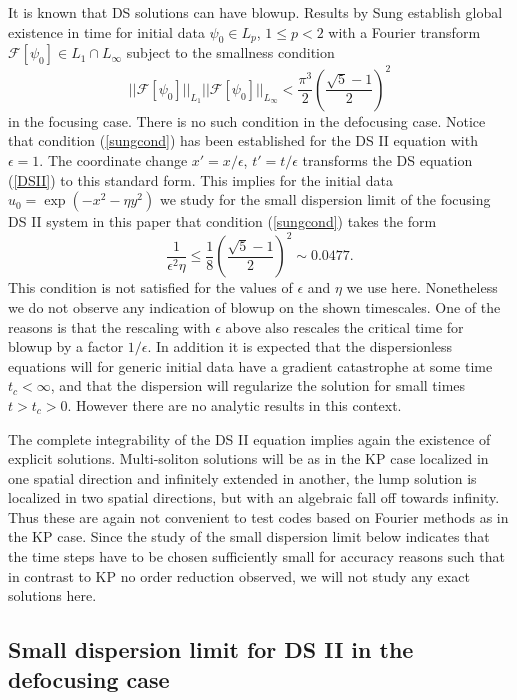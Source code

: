 \documentclass[final]{siamltex}
\begin{document}
It is known that DS solutions can have blowup. Results by Sung 
\cite{Sun} establish global existence in time for 
initial data $\psi_{0}\in L_{p}$, $1\leq p < 2$ with a Fourier 
transform $\mathcal{F}[\psi_{0}]\in L_{1}\cap L_{\infty}$ subject to the 
smallness condition 
\begin{equation}
    ||\mathcal{F}[\psi_{0}]||_{L_{1}}||\mathcal{F}[\psi_{0}]||_{L_{\infty}}
    <\frac{\pi^{3}}{2}\left(\frac{\sqrt{5}-1}{2}\right)^{2}
    \label{sungcond}
\end{equation}
in the 
focusing case. There is no such condition in the defocusing case. 
Notice that condition (\ref{sungcond}) has been established for the DS II 
equation with $\epsilon=1$. The coordinate change $x'=x/\epsilon$, 
$t'=t/\epsilon$ transforms the DS equation (\ref{DSII}) to this 
standard form. 
This implies for the initial data $u_{0}=\exp(-x^{2}-\eta y^{2})$ we study for the small dispersion 
limit of the focusing DS II system  in this paper that condition 
(\ref{sungcond}) takes the form 
$$\frac{1}{\epsilon^{2}\eta}\leq 
\frac{1}{8}\left(\frac{\sqrt{5}-1}{2}\right)^{2} \sim 0.0477.$$
This condition is not satisfied for the values of $\epsilon$ and 
$\eta$ we use here. Nonetheless we do not observe any indication 
of blowup on the shown timescales. One of the reasons is that the 
rescaling with $\epsilon$ above also rescales the critical time for 
blowup by a factor $1/\epsilon$. In addition it is expected 
that the dispersionless equations will for generic initial data have 
a gradient catastrophe at some time $t_{c}<\infty$, and that the 
dispersion will regularize the solution for small times $t>t_{c}>0$. 
However there are no analytic results in this context.

The complete integrability of the DS II equation implies again the 
existence of explicit solutions. Multi-soliton solutions will be as in 
the KP case localized in one spatial direction and infinitely 
extended in another, the lump solution is localized 
in two spatial directions, but with an algebraic fall off towards 
infinity. Thus these are again not convenient to test codes 
based on Fourier methods as in the KP case.  Since the study of 
the small dispersion limit below indicates that the time steps 
have to be chosen sufficiently small for accuracy reasons such that 
in contrast to KP no order reduction observed, we will not 
study any exact solutions here. 




\subsection{Small dispersion limit for DS II in the defocusing case}
\end{document}
